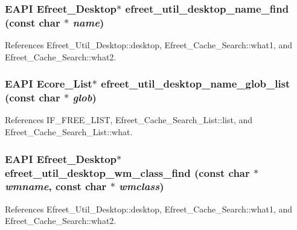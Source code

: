 \subsubsection[efreet\_\-util\_\-desktop\_\-name\_\-find]{\setlength{\rightskip}{0pt plus 5cm}EAPI {\bf Efreet\_\-Desktop}$\ast$ efreet\_\-util\_\-desktop\_\-name\_\-find (const char $\ast$ {\em name})}\label{efreet__utils_8h_0852e1834372099771d125aff627b952}




References Efreet\_\-Util\_\-Desktop::desktop, Efreet\_\-Cache\_\-Search::what1, and Efreet\_\-Cache\_\-Search::what2.
\subsubsection[efreet\_\-util\_\-desktop\_\-name\_\-glob\_\-list]{\setlength{\rightskip}{0pt plus 5cm}EAPI Ecore\_\-List$\ast$ efreet\_\-util\_\-desktop\_\-name\_\-glob\_\-list (const char $\ast$ {\em glob})}\label{efreet__utils_8h_4e1a01c2e8375828de99e6b91187278d}




References IF\_\-FREE\_\-LIST, Efreet\_\-Cache\_\-Search\_\-List::list, and Efreet\_\-Cache\_\-Search\_\-List::what.
\subsubsection[efreet\_\-util\_\-desktop\_\-wm\_\-class\_\-find]{\setlength{\rightskip}{0pt plus 5cm}EAPI {\bf Efreet\_\-Desktop}$\ast$ efreet\_\-util\_\-desktop\_\-wm\_\-class\_\-find (const char $\ast$ {\em wmname}, \/  const char $\ast$ {\em wmclass})}\label{efreet__utils_8h_3ba379dbad362695a66be9e0ae6bd7df}




References Efreet\_\-Util\_\-Desktop::desktop, Efreet\_\-Cache\_\-Search::what1, and Efreet\_\-Cache\_\-Search::what2.
